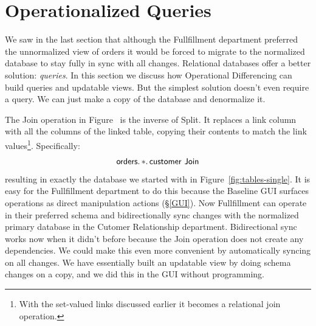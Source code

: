 \documentclass[english,submission]{programming}
\theoremstyle{definition}
\begin{document}
\section{Operationalized Queries}

We saw in the last section that although the Fullfillment department preferred the unnormalized view of orders it would be forced to migrate to the normalized database to stay fully in sync with all changes. Relational databases offer a better solution: \textit{queries}. In this section we discuss how Operational Differencing can build queries and updatable views. But the simplest solution doesn't even require a query. We can just make a copy of the database and denormalize it.

The \textsf{Join} operation in Figure~%
is the inverse of \textsf{Split}. It replaces a link column with all the columns of the linked table, copying their contents to match the link values\footnote{With the set-valued links discussed earlier it becomes a relational join operation.}. Specifically:
\[
\textsf{orders}\ldotp * \ldotp \textsf{customer Join} \\
\]
resulting in exactly the database we started with in Figure~\ref{fig:tables-single}. It is easy for the Fullfillment department to do this because the Baseline GUI surfaces operations as direct manipulation actions (\S\ref{GUI}). Now Fullfillment can operate in their preferred schema and bidirectionally sync changes with the normalized primary database in the Cutomer Relationship department. Bidirectional sync works now when it didn't before because the \textsf{Join} operation does not create any dependencies. We could make this even more convenient by automatically syncing on all changes. We have essentially built an updatable view by doing schema changes on a copy, and we did this in the GUI without programming.
\end{document}
